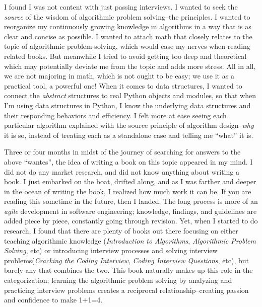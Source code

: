 \documentclass[../main.tex]{subfiles}
\begin{document}
I found I was not content with just passing interviews. I wanted to seek the \textit{source} of the wisdom of algorithmic problem solving--the principles. I wanted to reorganize my  continuously growing knowledge  in algorithms in a way that is as clear and concise as possible. I wanted to attach math  that closely relates to the topic of algorithmic problem solving, which would ease my nerves when reading  related books. But meanwhile I tried to avoid getting too deep and theoretical which may potentially deviate me from the topic and adds more stress. All in all, we are not majoring in math, which is not ought to be easy; we use it as a practical tool, a powerful one! When it comes to data structures, I wanted to connect the \textit{abstract} structures to real Python objects and modules, so that when I'm using data structures in Python, I know the underlying data structures and their responding  behaviors  and efficiency.  I felt more at ease seeing each particular algorithm explained with the source principle of algorithm design--\textit{why} it is so,  instead of treating each as  a standalone case and telling me ``what'' it is. %

Three or four months in midst of the journey of searching for answers to the above ``wantes'', the idea of writing a book on this topic appeared in my mind.  I did not do any market research, and did not know anything about writing a book. I just embarked on the boat, drifted along, and as I was farther and deeper in the ocean of writing the book, I realized how much work it can be. If you are reading this sometime in the future, then I landed. The long process is more of an \textit{agile} development in software engineering; knowledge, findings, and guidelines are added piece by piece,  constantly going through revision. 
Yet, when I started to do research, I found that there are plenty of books out there focusing on either teaching algorithmic knowledge (\textit{Introduction to Algorithms}, \textit{Algorithmic Problem Solving}, etc) or introducing interview processes and solving interview problems(\textit{Cracking the Coding Interview}, \textit{Coding Interview Questions}, etc), but barely any that combines the two. This book naturally  makes up this role in the categorization; learning the algorithmic problem solving by analyzing and practicing interview problems creates a reciprocal relationship--creating passion and confidence to make  1+1=4.
\end{document}
